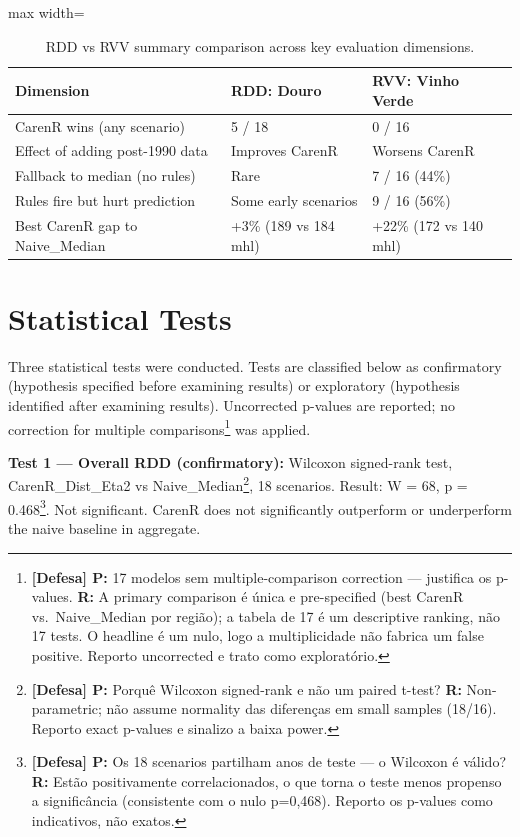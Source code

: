 \begin{table}[htbp]
  \centering
  \caption{RDD vs RVV summary comparison across key evaluation dimensions.}\label{tab:ch5a_5}
  \small
  \begin{adjustbox}{max width=\textwidth}
    \begin{tabularx}{\textwidth}{l|l|X}
  \toprule
  Dimension & RDD: Douro & RVV: Vinho Verde \\
  \midrule
  CarenR wins (any scenario) & 5 / 18 & 0 / 16 \\
  Effect of adding post-1990 data & Improves CarenR & Worsens CarenR \\
  Fallback to median (no rules) & Rare & 7 / 16 (44\%) \\
  Rules fire but hurt prediction & Some early scenarios & 9 / 16 (56\%) \\
  Best CarenR gap to Naive\_Median & +3\% (189 vs 184 mhl) & +22\% (172 vs 140 mhl) \\
  \bottomrule
\end{tabularx}
  \end{adjustbox}

\end{table}



\section{Statistical Tests}\label{sec:statistical_tests}

Three statistical tests were conducted. Tests are classified below as confirmatory (hypothesis specified before examining results) or exploratory (hypothesis identified after examining results). Uncorrected p-values are reported; no correction for multiple comparisons\footnote{\textbf{[Defesa] P:} 17 modelos sem multiple-comparison correction --- justifica os p-values. \textbf{R:} A primary comparison é única e pre-specified (best CarenR vs.\ Naive\_Median por região); a tabela de 17 é um descriptive ranking, não 17 tests. O headline é um nulo, logo a multiplicidade não fabrica um false positive. Reporto uncorrected e trato como exploratório.} was applied.

\textbf{Test 1 --- Overall RDD (confirmatory): }Wilcoxon signed-rank test, CarenR\_Dist\_Eta2 vs Naive\_Median\footnote{\textbf{[Defesa] P:} Porquê Wilcoxon signed-rank e não um paired t-test? \textbf{R:} Non-parametric; não assume normality das diferenças em small samples (18/16). Reporto exact p-values e sinalizo a baixa power.}, 18 scenarios. Result: W = 68, p = 0.468\footnote{\textbf{[Defesa] P:} Os 18 scenarios partilham anos de teste --- o Wilcoxon é válido? \textbf{R:} Estão positivamente correlacionados, o que torna o teste menos propenso a significância (consistente com o nulo p=0,468). Reporto os p-values como indicativos, não exatos.}. Not significant. CarenR does not significantly outperform or underperform the naive baseline in aggregate.

